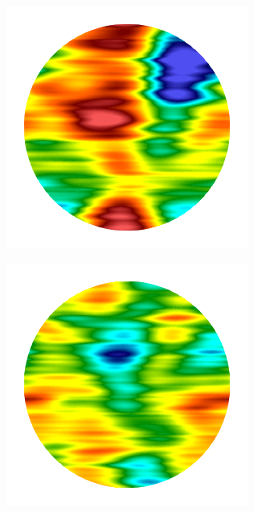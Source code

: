 \begin{figure}[htb!]
\begin{subfigure}{0.18\textwidth}
    \end{subfigure}
    \begin{subfigure}{0.19\textwidth}
        \includegraphics[width=\textwidth]{past/figures/Gc_brick.png}
    \end{subfigure}
    \begin{subfigure}{0.19\textwidth}
        \includegraphics[width=\textwidth]{past/figures/psic_brick.png}

\end{subfigure}
\end{figure}

